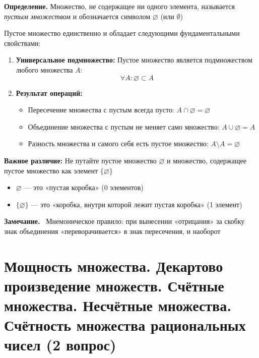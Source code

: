 \documentclass[a4paper,12pt]{article}
\newcommand{\myremark}{\textbf{Замечание.}\ }
\theoremstyle{definition}
\theoremstyle{plain}
\theoremstyle{remark}
\begin{document}
	\noindent \textbf{Определение.} Множество, не содержащее ни одного элемента, называется \textit{пустым множеством} и обозначается символом $\varnothing$ (или $\emptyset$)
	
	\bigskip
	Пустое множество единственно и обладает следующими фундаментальными свойствами:
	
	\begin{enumerate}
		\item \textbf{Универсальное подмножество:} Пустое множество является подмножеством любого множества $A$:
		\[ \forall A \colon \varnothing \subset A \]
		\item \textbf{Результат операций:} 
		\begin{itemize}
			\item Пересечение множества с пустым всегда пусто: $A \cap \varnothing = \varnothing$
			\item Объединение множества с пустым не меняет само множество: $A \cup \varnothing = A$
			\item Разность множества и самого себя есть пустое множество: $A \setminus A = \varnothing$
		\end{itemize}
	\end{enumerate}
	
	\begin{tcolorbox}[colback=yellow!5, colframe=orange!60!black]
		\textbf{Важное различие:} Не путайте пустое множество $\varnothing$ и множество, содержащее пустое множество как элемент $\{\varnothing\}$
		\begin{itemize}
			\item $\varnothing$ — это «пустая коробка» (0 элементов)
			\item $\{\varnothing\}$ — это «коробка, внутри которой лежит пустая коробка» (1 элемент)
		\end{itemize}
	\end{tcolorbox}
	
	\medskip
	\myremark
	Мнемоническое правило: при вынесении «отрицания» за скобку знак объединения «переворачивается» в знак пересечения, и наоборот
	
	
	
	
	
	
	
	
	
	\newpage
	\section{Мощность множества. Декартово произведение множеств. Счётные множества. Несчётные множества. Счётность множества рациональных чисел (2 вопрос)}
	
\end{document}
